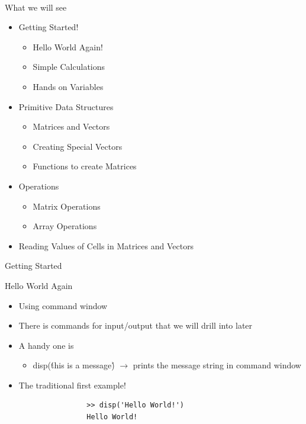 \documentclass{beamer}
\begin{document}
\begin{frame}{\\ What we will see}
	\begin{itemize}
		\item Getting Started!
			\begin{itemize}
				\item Hello World Again!
				\item Simple Calculations
				\item Hands on Variables
			\end{itemize}
		\item Primitive Data Structures
			\begin{itemize}
				\item Matrices and Vectors
				\item Creating Special Vectors
				\item Functions to create Matrices
			\end{itemize}
		\item Operations
			\begin{itemize}
				\item Matrix Operations
				\item Array Operations
			\end{itemize}
		\item Reading Values of Cells in Matrices and Vectors
	\end{itemize}
\end{frame}


\begin{frame}[fragile]{Getting Started}
	\begin{block}{Hello World Again}
	\begin{itemize}	
		\item Using command window
		\item There is commands for input/output that we will drill into later
		\item A handy one is
			\begin{itemize}
				\item disp(\'this is a message\') $\rightarrow$ prints the message string in command window
			\end{itemize}
		\item The traditional first example!
		\java
			\begin{lstlisting}
				>> disp('Hello World!')
				Hello World!
			\end{lstlisting}
	\end{itemize}	
	
	\end{block}
\end{frame}
\end{document}

